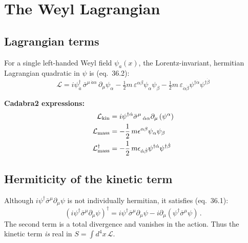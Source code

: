 \section{The Weyl Lagrangian}

\subsection{Lagrangian terms}

For a single left-handed Weyl field $\psi_a(x)$, the Lorentz-invariant,
hermitian Lagrangian quadratic in $\psi$ is (eq.~36.2):
\begin{equation}
  \boxed{
    \mathcal{L}
    = i\psi^\dagger_{\dot{a}}\,\bar{\sigma}^{\mu\,\dot{a}\alpha}\,\partial_\mu\psi_\alpha
    - \tfrac{1}{2}m\,\varepsilon^{\alpha\beta}\psi_\alpha\psi_\beta
    - \tfrac{1}{2}m\,\varepsilon_{\dot{\alpha}\dot{\beta}}\psi^{\dagger\dot{\alpha}}\psi^{\dagger\dot{\beta}}
  }
  \tag{36.2}
\end{equation}

\medskip
\noindent\textbf{Cadabra2 expressions:}
\begin{align*}
  \mathcal{L}_{\text{kin}} &= i \psi^{\dagger \dot{\alpha}} \bar{\sigma}^{\mu}\,_{\dot{\alpha} \alpha} \partial_{\mu}\left(\psi^{\alpha}\right) \\
  \mathcal{L}_{\text{mass}} &=  - \frac{1}{2}\,m \epsilon^{\alpha \beta} \psi_{\alpha} \psi_{\beta} \\
  \mathcal{L}_{\text{mass}}^\dagger &=  - \frac{1}{2}\,m \epsilon_{\dot{\alpha} \dot{\beta}} \psi^{\dagger \dot{\alpha}} \psi^{\dagger \dot{\beta}}
\end{align*}

\subsection{Hermiticity of the kinetic term}

Although $i\psi^\dagger\bar{\sigma}^\mu\partial_\mu\psi$ is not individually
hermitian, it satisfies (eq.~36.1):
\begin{equation}
  (i\psi^\dagger\bar{\sigma}^\mu\partial_\mu\psi)^\dagger
  = i\psi^\dagger\bar{\sigma}^\mu\partial_\mu\psi
    - i\partial_\mu(\psi^\dagger\bar{\sigma}^\mu\psi)\,.
  \tag{36.1}
\end{equation}
The second term is a total divergence and vanishes in the action.
Thus the kinetic term \emph{is} real in $S = \int d^4x\,\mathcal{L}$.


